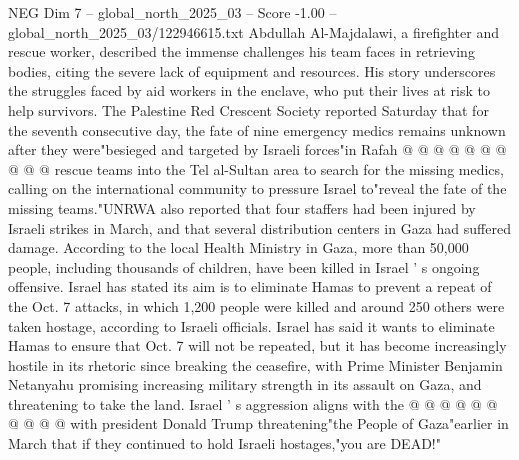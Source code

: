 \begin{textsample}{NEG Dim 7 – global\_north\_2025\_03 – Score -1.00 – global\_north\_2025\_03/122946615.txt}
Abdullah Al-Majdalawi, a firefighter and rescue worker, described the immense challenges his team faces in retrieving bodies, citing the severe lack of equipment and resources.
His story underscores the struggles faced by aid workers in the enclave, who put their lives at risk to help survivors.
The Palestine Red Crescent Society reported Saturday that for the seventh consecutive day, the fate of nine emergency medics remains unknown after they were"besieged and targeted by Israeli forces"in Rafah @ @ @ @ @ @ @ @ @ @ rescue teams into the Tel al-Sultan area to search for the missing medics, calling on the international community to pressure Israel to"reveal the fate of the missing teams."UNRWA also reported that four staffers had been injured by Israeli strikes in March, and that several distribution centers in Gaza had suffered damage.
According to the local Health Ministry in Gaza, more than 50,000 people, including thousands of children, have been killed in Israel ' s ongoing offensive.
Israel has stated its aim is to eliminate Hamas to prevent a repeat of the Oct. 7 attacks, in which 1,200 people were killed and around 250 others were taken hostage, according to Israeli officials.
Israel has said it wants to eliminate Hamas to ensure that Oct. 7 will not be repeated, but it has become increasingly hostile in its rhetoric since breaking the ceasefire, with Prime Minister Benjamin Netanyahu promising increasing military strength in its assault on Gaza, and threatening to take the land.
Israel ' s aggression aligns with the @ @ @ @ @ @ @ @ @ @ with president Donald Trump threatening"the People of Gaza"earlier in March that if they continued to hold Israeli hostages,"you are DEAD!"

\end{textsample}
